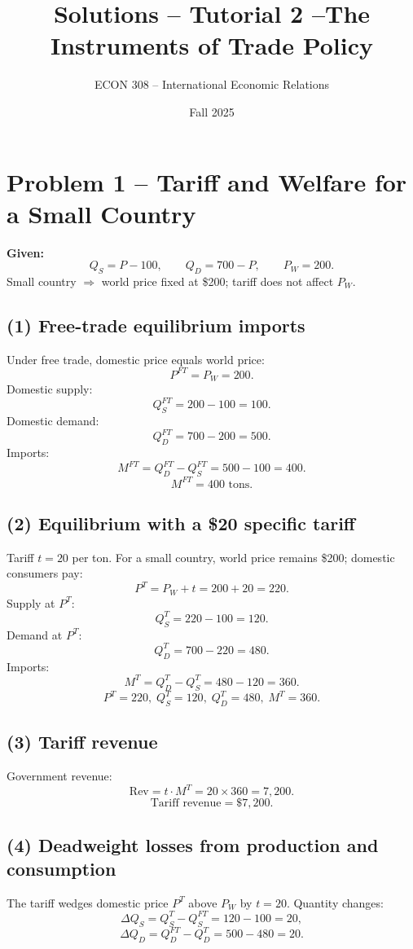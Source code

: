 \documentclass[12pt]{article}
\title{Solutions -- Tutorial 2 --The Instruments of Trade Policy}
\author{ECON 308 -- International Economic Relations}
\date{Fall 2025}
\begin{document}
\maketitle

\section*{Problem 1 – Tariff and Welfare for a Small Country}

\textbf{Given:}
\[
Q_S = P - 100,\qquad Q_D = 700 - P,\qquad P_W = 200.
\]
Small country $\Rightarrow$ world price fixed at \$200; tariff does not affect $P_W$.

\subsection*{(1) Free-trade equilibrium imports}

Under free trade, domestic price equals world price:
\[
P^{FT} = P_W = 200.
\]
Domestic supply:
\[
Q_S^{FT} = 200 - 100 = 100.
\]
Domestic demand:
\[
Q_D^{FT} = 700 - 200 = 500.
\]
Imports:
\[
M^{FT} = Q_D^{FT} - Q_S^{FT} = 500 - 100 = 400.
\]
\[
\boxed{M^{FT} = 400 \text{ tons.}}
\]

\subsection*{(2) Equilibrium with a \$20 specific tariff}

Tariff $t = 20$ per ton. For a small country, world price remains \$200; domestic consumers pay:
\[
P^{T} = P_W + t = 200 + 20 = 220.
\]
Supply at $P^T$:
\[
Q_S^{T} = 220 - 100 = 120.
\]
Demand at $P^T$:
\[
Q_D^{T} = 700 - 220 = 480.
\]
Imports:
\[
M^{T} = Q_D^{T} - Q_S^{T} = 480 - 120 = 360.
\]
\[
\boxed{P^T = 220,\; Q_S^{T} = 120,\; Q_D^{T} = 480,\; M^{T} = 360.}
\]

\subsection*{(3) Tariff revenue}

Government revenue:
\[
\text{Rev} = t \cdot M^{T} = 20 \times 360 = 7{,}200.
\]
\[
\boxed{\text{Tariff revenue} = \$7{,}200.}
\]

\subsection*{(4) Deadweight losses from production and consumption}

The tariff wedges domestic price $P^T$ above $P_W$ by $t=20$.  
Quantity changes:
\[
\Delta Q_S = Q_S^{T} - Q_S^{FT} = 120 - 100 = 20,
\]
\[
\Delta Q_D = Q_D^{FT} - Q_D^{T} = 500 - 480 = 20.
\]
\end{document}
